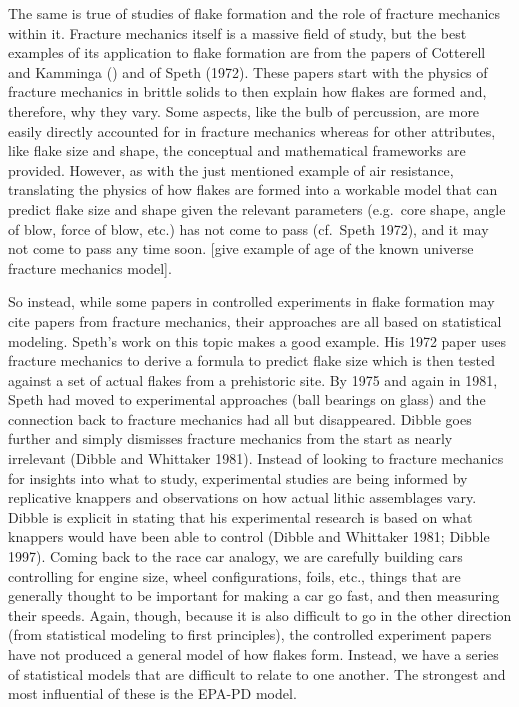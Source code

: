 \documentclass[10pt,letterpaper]{article}
\begin{document}
The same is true of studies of flake formation and the role of fracture
mechanics within it. Fracture mechanics itself is a massive field of
study, but the best examples of its application to flake formation are
from the papers of Cotterell and Kamminga () and of Speth (1972). These
papers start with the physics of fracture mechanics in brittle solids to
then explain how flakes are formed and, therefore, why they vary. Some
aspects, like the bulb of percussion, are more easily directly accounted
for in fracture mechanics whereas for other attributes, like flake size
and shape, the conceptual and mathematical frameworks are provided.
However, as with the just mentioned example of air resistance,
translating the physics of how flakes are formed into a workable model
that can predict flake size and shape given the relevant parameters
(e.g.~core shape, angle of blow, force of blow, etc.) has not come to
pass (cf.~Speth 1972), and it may not come to pass any time soon.
{[}give example of age of the known universe fracture mechanics
model{]}.

So instead, while some papers in controlled experiments in flake
formation may cite papers from fracture mechanics, their approaches are
all based on statistical modeling. Speth's work on this topic makes a
good example. His 1972 paper uses fracture mechanics to derive a formula
to predict flake size which is then tested against a set of actual
flakes from a prehistoric site. By 1975 and again in 1981, Speth had
moved to experimental approaches (ball bearings on glass) and the
connection back to fracture mechanics had all but disappeared. Dibble
goes further and simply dismisses fracture mechanics from the start as
nearly irrelevant (Dibble and Whittaker 1981). Instead of looking to
fracture mechanics for insights into what to study, experimental studies
are being informed by replicative knappers and observations on how
actual lithic assemblages vary. Dibble is explicit in stating that his
experimental research is based on what knappers would have been able to
control (Dibble and Whittaker 1981; Dibble 1997). Coming back to the
race car analogy, we are carefully building cars controlling for engine
size, wheel configurations, foils, etc., things that are generally
thought to be important for making a car go fast, and then measuring
their speeds. Again, though, because it is also difficult to go in the
other direction (from statistical modeling to first principles), the
controlled experiment papers have not produced a general model of how
flakes form. Instead, we have a series of statistical models that are
difficult to relate to one another. The strongest and most influential
of these is the EPA-PD model.
\end{document}
